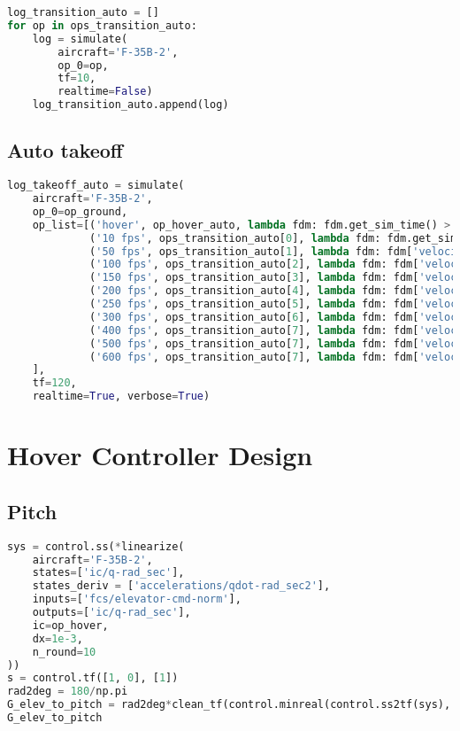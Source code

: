 \begin{lstlisting}[language=Python]
log_transition_auto = []
for op in ops_transition_auto:
    log = simulate(
        aircraft='F-35B-2',
        op_0=op,
        tf=10,
        realtime=False)
    log_transition_auto.append(log)
\end{lstlisting}

\hypertarget{auto-takeoff}{%
\subsection{Auto takeoff}\label{auto-takeoff}}

\begin{lstlisting}[language=Python]
log_takeoff_auto = simulate(
    aircraft='F-35B-2',
    op_0=op_ground,
    op_list=[('hover', op_hover_auto, lambda fdm: fdm.get_sim_time() > 1),
             ('10 fps', ops_transition_auto[0], lambda fdm: fdm.get_sim_time() > 10),
             ('50 fps', ops_transition_auto[1], lambda fdm: fdm['velocities/vt-fps'] > 50),
             ('100 fps', ops_transition_auto[2], lambda fdm: fdm['velocities/vt-fps'] > 100),
             ('150 fps', ops_transition_auto[3], lambda fdm: fdm['velocities/vt-fps'] > 150),
             ('200 fps', ops_transition_auto[4], lambda fdm: fdm['velocities/vt-fps'] > 200),
             ('250 fps', ops_transition_auto[5], lambda fdm: fdm['velocities/vt-fps'] > 250),
             ('300 fps', ops_transition_auto[6], lambda fdm: fdm['velocities/vt-fps'] > 300),
             ('400 fps', ops_transition_auto[7], lambda fdm: fdm['velocities/vt-fps'] > 400),
             ('500 fps', ops_transition_auto[7], lambda fdm: fdm['velocities/vt-fps'] > 500),
             ('600 fps', ops_transition_auto[7], lambda fdm: fdm['velocities/vt-fps'] > 600),
    ],
    tf=120,
    realtime=True, verbose=True)
\end{lstlisting}

\hypertarget{hover-controller-design}{%
\section{Hover Controller Design}\label{hover-controller-design}}

\hypertarget{pitch}{%
\subsection{Pitch}\label{pitch}}

\begin{lstlisting}[language=Python]
sys = control.ss(*linearize(
    aircraft='F-35B-2',
    states=['ic/q-rad_sec'],
    states_deriv = ['accelerations/qdot-rad_sec2'],
    inputs=['fcs/elevator-cmd-norm'],
    outputs=['ic/q-rad_sec'],
    ic=op_hover,
    dx=1e-3,
    n_round=10
))
s = control.tf([1, 0], [1])
rad2deg = 180/np.pi
G_elev_to_pitch = rad2deg*clean_tf(control.minreal(control.ss2tf(sys), 1e-10))/s  # in degrees
G_elev_to_pitch
\end{lstlisting}

